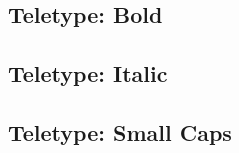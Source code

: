 \subsection{Teletype: Bold}
\begin{ttfamily}
    \begin{bfseries}
        \blindtext
    \end{bfseries}
\end{ttfamily}

\subsection{Teletype: Italic}
\begin{ttfamily}
    \begin{itshape}
        \blindtext
    \end{itshape}
\end{ttfamily}

\subsection{Teletype: Small Caps}
\begin{ttfamily}
    \begin{scshape}
        \blindtext
    \end{scshape}
\end{ttfamily}
